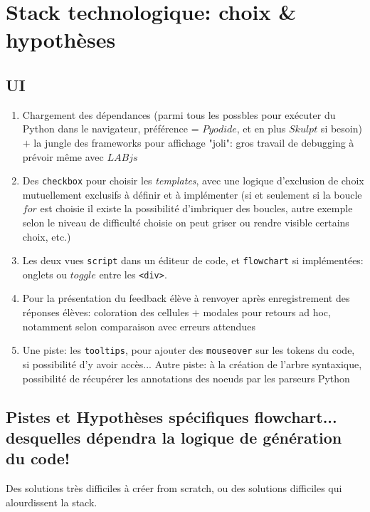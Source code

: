 \documentclass[11pt,a4paper]{article}
\begin{document}
\section{Stack technologique: choix \& hypothèses}

\subsection{UI}

\begin{enumerate}
    \item Chargement des dépendances (parmi tous les possbles pour exécuter du Python dans le navigateur, préférence = $Pyodide$, et en plus $Skulpt$ si besoin) $+$ la jungle des frameworks pour affichage "joli": gros travail de debugging à prévoir même avec $LABjs$
    
    \item Des \texttt{checkbox} pour choisir les \textit{templates}, avec une logique d'exclusion de choix mutuellement exclusifs à définir et à implémenter (si et seulement si la boucle $for$ est choisie il existe la possibilité d'imbriquer des boucles, autre exemple selon le niveau de difficulté choisie on peut griser ou rendre visible certains choix, etc.)
    
    \item Les deux vues  \texttt{script} dans un éditeur de code, et \texttt{flowchart} si implémentées: onglets ou $toggle$ entre les \texttt{<div>}.
    
    \item Pour la présentation du feedback élève à renvoyer après enregistrement des réponses élèves: coloration des cellules $+$ modales pour retours ad hoc, notamment selon comparaison avec erreurs attendues
    
    \item Une piste: les \texttt{tooltips}, pour ajouter des \texttt{mouseover} sur les tokens du code, si possibilité d'y avoir accès... Autre piste: à la création de l'arbre syntaxique, possibilité de récupérer les annotations des noeuds par les parseurs Python
\end{enumerate}

\subsection{Pistes et Hypothèses spécifiques flowchart... desquelles dépendra la logique de génération du code!}

Des solutions très difficiles à créer from scratch, ou des solutions difficiles qui alourdissent la stack.
\end{document}
